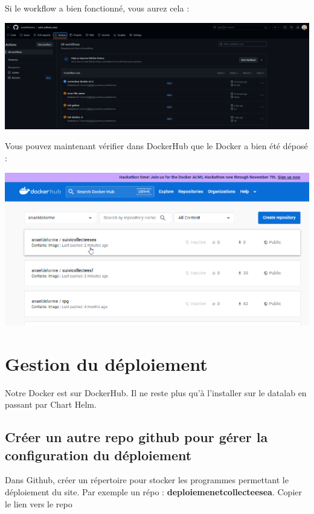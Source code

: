 \documentclass[
  letterpaper,
  DIV=11,
  numbers=noendperiod]{scrreprt}
\begin{document}
Si le workflow a bien fonctionné, vous aurez cela :

\includegraphics{./images/github_actions_ok.png}

Vous pouvez maintenant vérifier dans DockerHub que le Docker a bien été
déposé :

\includegraphics{./images/dockerhub_ok.png}

\hypertarget{gestion-du-duxe9ploiement}{%
\section{Gestion du déploiement}\label{gestion-du-duxe9ploiement}}

Notre Docker est sur DockerHub. Il ne reste plus qu'à l'installer sur le
datalab en passant par Chart Helm.

\hypertarget{cruxe9er-un-autre-repo-github-pour-guxe9rer-la-configuration-du-duxe9ploiement}{%
\subsection{Créer un autre repo github pour gérer la configuration du
déploiement}\label{cruxe9er-un-autre-repo-github-pour-guxe9rer-la-configuration-du-duxe9ploiement}}

Dans Github, créer un répertoire pour stocker les programmes permettant
le déploiement du site. Par exemple un répo :
\textbf{deploiemenetcollecteesea}. Copier le lien vers le repo
\end{document}
